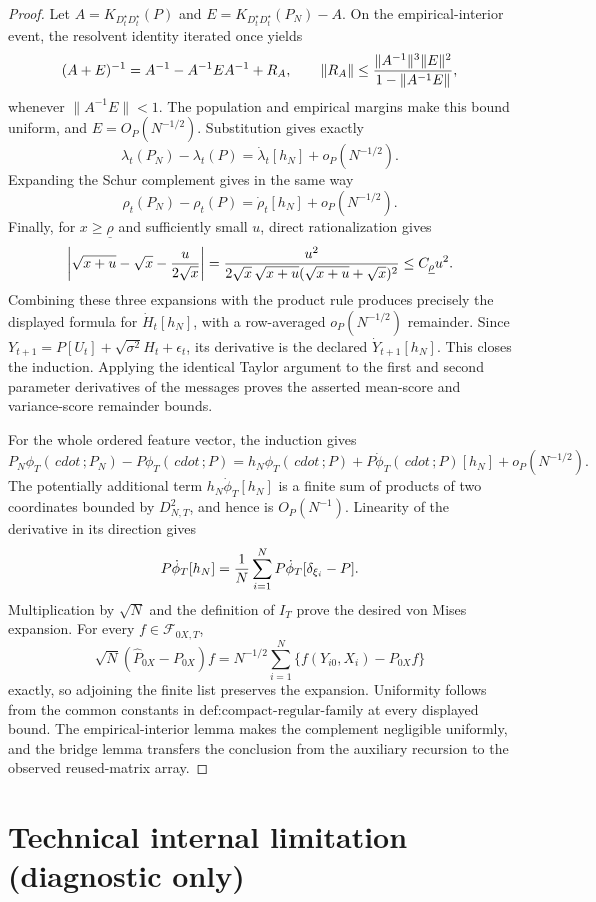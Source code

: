 \documentclass{article}
\begin{document}
\begin{proof}
Let \(A=K_{D_t^{\star}D_t^{\star}}(P)\) and \(E=K_{D_t^{\star}D_t^{\star}}(P_N)-A\).  On the empirical-interior event, the resolvent identity iterated once yields
\[
 (A+E)^{-1}=A^{-1}-A^{-1}EA^{-1}+R_A,
 \qquad \|R_A\|\le {\|A^{-1}\|^3\|E\|^2\over1-\|A^{-1}E\|},
\]
whenever \(\|A^{-1}E\|<1\).  The population and empirical margins make this bound uniform, and \(E=O_P(N^{-1/2})\).  Substitution gives exactly
\[
 \lambda_t(P_N)-\lambda_t(P)=\dot\lambda_t[h_N]+o_P(N^{-1/2}).
\]
Expanding the Schur complement gives in the same way
\[
 \rho_t(P_N)-\rho_t(P)=\dot\rho_t[h_N]+o_P(N^{-1/2}).
\]
Finally, for \(x\ge\underline\rho\) and sufficiently small \(u\), direct rationalization gives
\[
 \left|\sqrt{x+u}-\sqrt x-{u\over2\sqrt x}\right|
 ={u^2\over2\sqrt x\,\sqrt{x+u}(\sqrt{x+u}+\sqrt x)^2}
 \le C_{\underline\rho}u^2.
\]
Combining these three expansions with the product rule produces precisely the displayed formula for \(\dot H_t[h_N]\), with a row-averaged \(o_P(N^{-1/2})\) remainder.  Since \(Y_{t+1}=P[U_t]+\sqrt{\sigma^2}H_t+\epsilon_t\), its derivative is the declared \(\dot Y_{t+1}[h_N]\).  This closes the induction.  Applying the identical Taylor argument to the first and second parameter derivatives of the messages proves the asserted mean-score and variance-score remainder bounds.

For the whole ordered feature vector, the induction gives
\[
 P_N\phi_T(\,cdot\,;P_N)-P\phi_T(\,cdot\,;P)
 =h_N\phi_T(\,cdot\,;P)+P\dot\phi_T(\,cdot\,;P)[h_N]+o_P(N^{-1/2}).
\]
The potentially additional term \(h_N\dot\phi_T[h_N]\) is a finite sum of products of two coordinates bounded by \(D_{N,T}^2\), and hence is \(O_P(N^{-1})\).  Linearity of the derivative in its direction gives
\[
 P\dot\phi_T[h_N]
 ={1\over N}\sum_{i=1}^NP\dot\phi_T[\delta_{\xi_i}-P].
\]
Multiplication by \(\sqrt N\) and the definition of \(I_T\) prove the desired von Mises expansion.  For every \(f\in\mathcal F_{0X,T}\),
\[
 \sqrt N(\widehat P_{0X}-P_{0X})f
 =N^{-1/2}\sum_{i=1}^N\{f(Y_{i0},X_i)-P_{0X}f\}
\]
exactly, so adjoining the finite list preserves the expansion.  Uniformity follows from the common constants in \(\text{def:compact-regular-family}\) at every displayed bound.  The empirical-interior lemma makes the complement negligible uniformly, and the bridge lemma transfers the conclusion from the auxiliary recursion to the observed reused-matrix array.
\end{proof}

\section*{Technical internal limitation (diagnostic only)}
\end{document}
